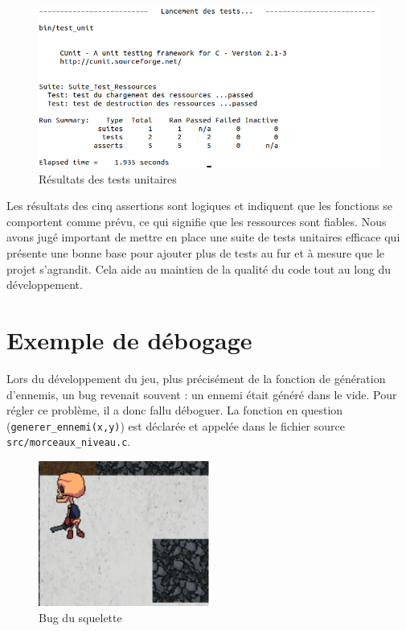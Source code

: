 \documentclass[a4paper,12pt]{article}
\begin{document}
\begin{appendices}
\begin{figure}[h]
	\centering
	\includegraphics[width=\textwidth]{img/capture_tests.png}
	\caption{Résultats des tests unitaires}
	\label{tests}
\end{figure}

Les résultats des cinq assertions sont logiques et indiquent que les fonctions se comportent comme prévu, ce qui signifie que les ressources sont fiables.
Nous avons jugé important de mettre en place une suite de tests unitaires efficace qui présente une bonne base pour ajouter plus de tests au fur et à mesure que le projet s'agrandit. Cela aide au maintien de la qualité du code tout au long du développement.

\section{Exemple de débogage}
Lors du développement du jeu, plus précisément de la fonction de génération d'ennemis, un bug revenait souvent : un ennemi était généré dans le vide. Pour régler ce problème, il a donc fallu déboguer.
La fonction en question (\texttt{generer\_ennemi(x,y)}) est déclarée et appelée dans le fichier source \texttt{src/morceaux\_niveau.c}.

\begin{figure}[H]
	\centering
	\includegraphics[width=0.5\textwidth]{img/bug.png}
	\caption{Bug du squelette}
	\label{Bug}
\end{figure}


\end{appendices}
\end{document}
